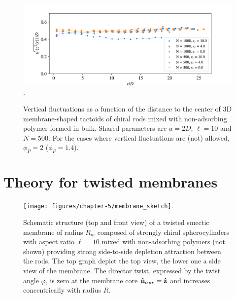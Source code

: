 \begin{figure}
\begin{center}
\includegraphics[width= \columnwidth]{figures/chapter-5/zstd}.
	\caption{Vertical fluctuations as a function of the distance to the center of 3D membrane-shaped tactoids of chiral rods mixed with non-adsorbing polymer formed in bulk. Shared parameters are $a = 2D$, $\ell = 10$ and $N = 500$. For the cases where vertical fluctuations are (not) allowed, $\phi_P=2$ ($\phi_P=1.4$). } %
\end{center}
\end{figure}





\section{Theory for twisted membranes}




\begin{figure}
\texttt{[image: figures/chapter-5/membrane\_sketch]}.
\caption{ \label{memsnap} Schematic structure (top and front view) of a twisted smectic membrane of radius $R_{m}$ composed of strongly chiral spherocylinders with aspect ratio $\ell = 10$ mixed with non-adsorbing polymers (not shown) providing strong side-to-side depletion attraction between the rods.  The top graph depict the top view, the lower one a side view of the membrane. The director twist, expressed by the twist angle $\varphi$, is zero at  the membrane  core ${\bf \hat{n}} _{\rm core} = {\bf \hat{z}}$ and increases concentrically with radius $R$.}
\end{figure}




